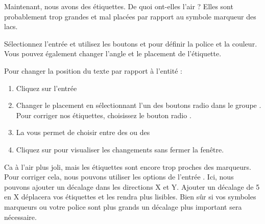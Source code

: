 Maintenant, nous avons des étiquettes. De quoi ont-elles l'air ? Elles sont probablement trop grandes et mal placées par rapport au symbole marqueur des lacs.

Sélectionnez l'entrée  et utilisez les boutons  et  pour définir la police et la couleur. Vous pouvez également changer l'angle et le placement de l'étiquette.

Pour changer la position du texte par rapport à l'entité :

\begin{enumerate}
\item Cliquez sur l'entrée 
\item Changer le placement en sélectionnant l'un des boutons radio dans le groupe . Pour corriger nos étiquettes, choisissez le bouton radio .
\item La  vous permet de choisir entre  des  ou des 
\item Cliquez sur  pour visualiser les changements sans fermer la fenêtre.
\end{enumerate}

Ca à l'air plus joli, mais les étiquettes sont encore trop proches des marqueurs. Pour corriger cela, nous pouvons utiliser les options de l'entrée . Ici, nous pouvons ajouter un décalage dans les directions X et Y. Ajouter un décalage de 5 en X déplacera vos étiquettes et les rendra plus lisibles. Bien sûr si vos symboles marqueurs ou votre police sont plus grands un décalage plus important sera nécessaire.

